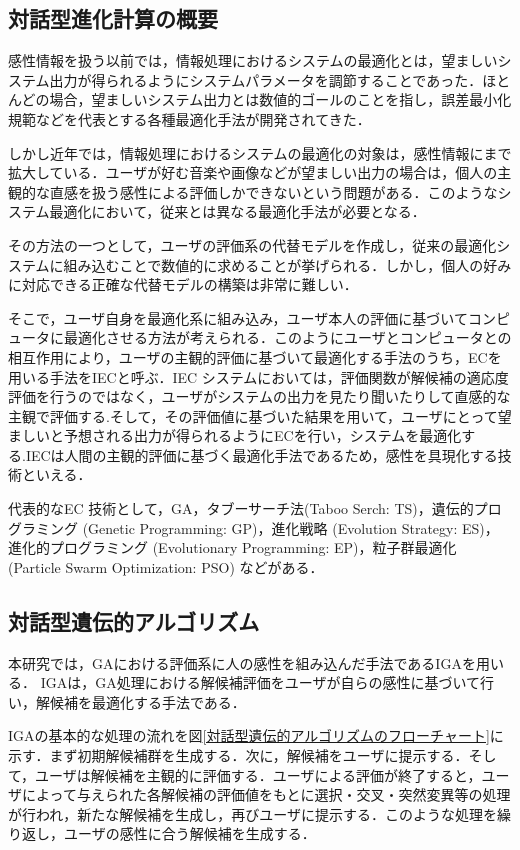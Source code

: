 \subsection{対話型進化計算の概要}
\label{sec2.2.1}

感性情報を扱う以前では，情報処理におけるシステムの最適化とは，望ましいシステム出力が得られるようにシステムパラメータを調節することであった．ほとんどの場合，望ましいシステム出力とは数値的ゴールのことを指し，誤差最小化規範などを代表とする各種最適化手法が開発されてきた\cite{GA2}．

しかし近年では，情報処理におけるシステムの最適化の対象は，感性情報にまで拡大している．ユーザが好む音楽や画像などが望ましい出力の場合は，個人の主観的な直感を扱う感性による評価しかできないという問題がある．このようなシステム最適化において，従来とは異なる最適化手法が必要となる．

その方法の一つとして，ユーザの評価系の代替モデルを作成し，従来の最適化システムに組み込むことで数値的に求めることが挙げられる．しかし，個人の好みに対応できる正確な代替モデルの構築は非常に難しい．

そこで，ユーザ自身を最適化系に組み込み，ユーザ本人の評価に基づいてコンピュータに最適化させる方法が考えられる．このようにユーザとコンピュータとの相互作用により，ユーザの主観的評価に基づいて最適化する手法のうち，ECを用いる手法をIECと呼ぶ\cite{IEC}．IEC システムにおいては，評価関数が解候補の適応度評価を行うのではなく，ユーザがシステムの出力を見たり聞いたりして直感的な主観で評価する.そして，その評価値に基づいた結果を用いて，ユーザにとって望ましいと予想される出力が得られるようにECを行い，システムを最適化する.IECは人間の主観的評価に基づく最適化手法であるため，感性を具現化する技術といえる．

代表的なEC 技術として，GA，タブーサーチ法(Taboo Serch: TS)，遺伝的プログラミング (Genetic Programming: GP)，進化戦略 (Evolution Strategy: ES)，進化的プログラミング (Evolutionary Programming: EP)，粒子群最適化 (Particle Swarm Optimization: PSO) などがある．
    
\subsection{対話型遺伝的アルゴリズム}
\label{sec2.2.2}

本研究では，GAにおける評価系に人の感性を組み込んだ手法であるIGAを用いる．
IGAは，GA処理における解候補評価をユーザが自らの感性に基づいて行い，解候補を最適化する手法である．

IGAの基本的な処理の流れを図\ref{対話型遺伝的アルゴリズムのフローチャート}に示す．まず初期解候補群を生成する．次に，解候補をユーザに提示する．そして，ユーザは解候補を主観的に評価する．ユーザによる評価が終了すると，ユーザによって与えられた各解候補の評価値をもとに選択・交叉・突然変異等の処理が行われ，新たな解候補を生成し，再びユーザに提示する．このような処理を繰り返し，ユーザの感性に合う解候補を生成する．

